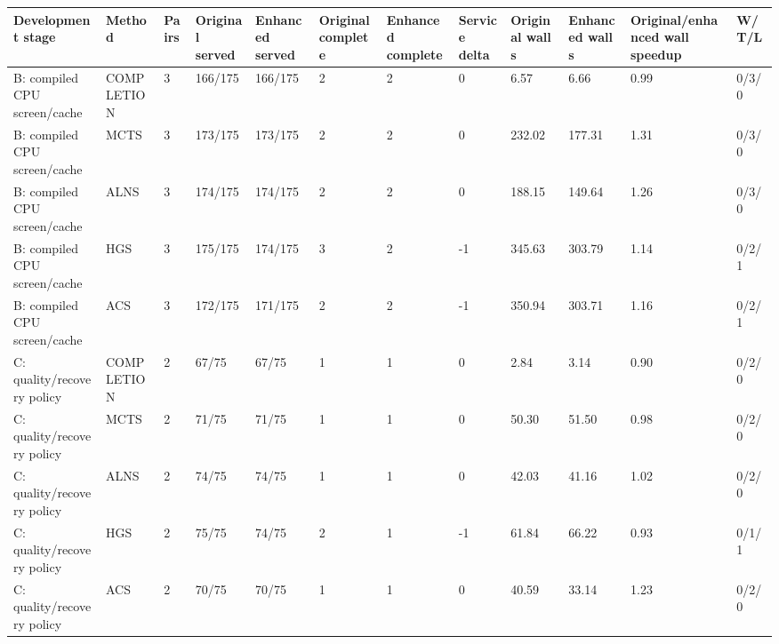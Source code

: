\begin{tabular}{llllllllllll}
\hline
Development stage & Method & Pairs & Original served & Enhanced served & Original complete & Enhanced complete & Service delta & Original wall s & Enhanced wall s & Original/enhanced wall speedup & W/T/L \\
\hline
B: compiled CPU screen/cache & COMPLETION & 3 & 166/175 & 166/175 & 2 & 2 & 0 & 6.57 & 6.66 & 0.99 & 0/3/0 \\
B: compiled CPU screen/cache & MCTS & 3 & 173/175 & 173/175 & 2 & 2 & 0 & 232.02 & 177.31 & 1.31 & 0/3/0 \\
B: compiled CPU screen/cache & ALNS & 3 & 174/175 & 174/175 & 2 & 2 & 0 & 188.15 & 149.64 & 1.26 & 0/3/0 \\
B: compiled CPU screen/cache & HGS & 3 & 175/175 & 174/175 & 3 & 2 & -1 & 345.63 & 303.79 & 1.14 & 0/2/1 \\
B: compiled CPU screen/cache & ACS & 3 & 172/175 & 171/175 & 2 & 2 & -1 & 350.94 & 303.71 & 1.16 & 0/2/1 \\
C: quality/recovery policy & COMPLETION & 2 & 67/75 & 67/75 & 1 & 1 & 0 & 2.84 & 3.14 & 0.90 & 0/2/0 \\
C: quality/recovery policy & MCTS & 2 & 71/75 & 71/75 & 1 & 1 & 0 & 50.30 & 51.50 & 0.98 & 0/2/0 \\
C: quality/recovery policy & ALNS & 2 & 74/75 & 74/75 & 1 & 1 & 0 & 42.03 & 41.16 & 1.02 & 0/2/0 \\
C: quality/recovery policy & HGS & 2 & 75/75 & 74/75 & 2 & 1 & -1 & 61.84 & 66.22 & 0.93 & 0/1/1 \\
C: quality/recovery policy & ACS & 2 & 70/75 & 70/75 & 1 & 1 & 0 & 40.59 & 33.14 & 1.23 & 0/2/0 \\
\hline
\end{tabular}
